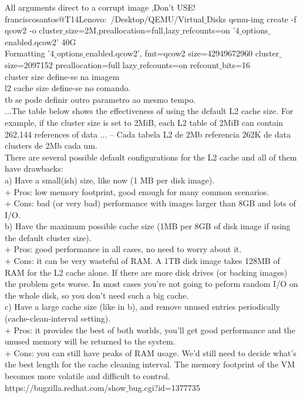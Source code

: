 \documentclass[11pt, a4paper, oneside]{article}
\theoremstyle{definition}
\begin{document}
All arguments direct to a corrupt image ,Don't USE!\\
franciscosantos@T14Lenovo:~/Desktop/QEMU/Virtual$\_$Disks qemu-img create -f qcow2 -o cluster$\_$size=2M,preallocation=full,lazy$\_$refcounts=on '4$\_$options$\_$enabled.qcow2' 40G\\
Formatting '4$\_$options$\_$enabled.qcow2', fmt=qcow2 size=42949672960 cluster$\_$size=2097152 preallocation=full lazy$\_$refcounts=on refcount$\_$bits=16\\

cluster size define-se na imagem\\
l2 cache size define-se no comando. \\
tb se pode definir outro parametro ao mesmo tempo. \\

...The table below shows the effectiveness of using the default L2 cache size. For example, if the cluster size is set to 2MiB, each L2 table of 2MiB can contain 262,144 references of data ... -- Cada tabela L2 de 2Mb referencia 262K de data clusters de 2Mb cada um.\\
There are several possible default configurations for the L2 cache and
all of them have drawbacks:\\

a) Have a small(ish) size, like now (1 MB per disk image).\\
   + Pros: low memory footprint, good enough for many common scenarios.\\
   + Cons: bad (or very bad) performance with images larger than 8GB
           and lots of I/O.\\

b) Have the maximum possible cache size (1MB per 8GB of disk image if
   using the default cluster size).\\
   + Pros: good performance in all cases, no need to worry about it.\\
   + Cons: it can be very wasteful of RAM. A 1TB disk image takes
           128MB of RAM for the L2 cache alone. If there are more disk
           drives (or backing images) the problem gets worse. In most
           cases you're not going to peform random I/O on the whole
           disk, so you don't need such a big cache.\\
c) Have a large cache size (like in b), and remove unused entries
   periodically (cache-clean-interval setting).\\
   + Pros: it provides the best of both worlds, you'll get good
           performance and the unused memory will be returned to the
           system.\\
   + Cons: you can still have peaks of RAM usage. We'd still need to
           decide what's the best length for the cache cleaning
           interval. The memory footprint of the VM becomes more
           volatile and difficult to control.\\
https://bugzilla.redhat.com/show$\_$bug.cgi?id=1377735
\end{document}
